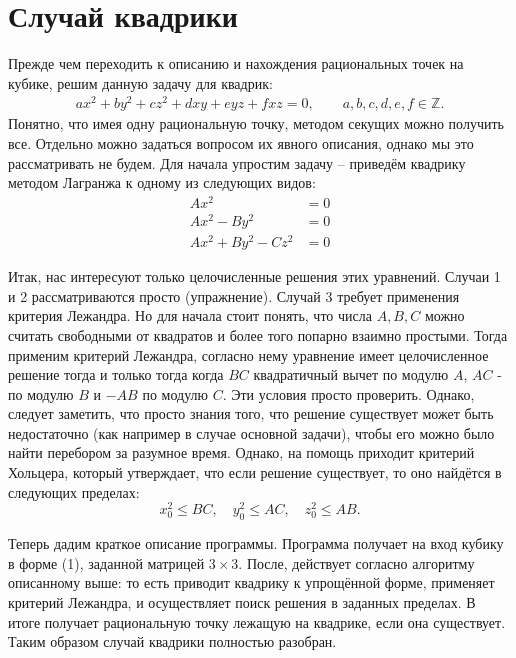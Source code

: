\section*{Случай квадрики}



Прежде чем переходить к описанию и нахождения рациональных точек на кубике,
решим данную задачу для квадрик:
\begin{align}
    a x^2 + b y^2 + c z^2 + d x y + e y z + f x z = 0,  \qquad a, b, c, d, e, f \in
    \mathbb{Z} 
.\end{align}
Понятно, что имея одну рациональную точку, методом секущих можно получить
все. Отдельно можно задаться вопросом их явного описания, однако мы это
рассматривать не будем. Для начала упростим задачу -- приведём квадрику
методом Лагранжа к одному из следующих видов:
\begin{align*}
    A x^2 &= 0 \\
    A x^2 - B y^2 &= 0 \\
    A x^2 + B y^2 - C z^2 &= 0 
\end{align*}

Итак, нас интересуют только целочисленные решения этих уравнений. Случаи 1 и 2
рассматриваются просто (упражнение). Случай 3 требует применения
критерия Лежандра. Но для начала стоит понять, что числа $ A, B, C$ можно
считать свободными от квадратов и более того попарно взаимно простыми. Тогда
применим критерий Лежандра, согласно нему уравнение имеет целочисленное
решение тогда и только тогда когда \(BC\) квадратичный вычет по модулю \(A\),
\(AC\) - по модулю \(B\) и \(-AB\)  по модулю \(C\). Эти условия просто
проверить. Однако, следует заметить, что просто знания того, что решение
существует может быть недостаточно (как например в случае основной задачи),
чтобы его можно было найти перебором за разумное время. Однако, на помощь
приходит критерий Хольцера, который утверждает, что если решение существует,
то оно найдётся в следующих пределах:
\[
x_0^2 \leqslant BC, \quad y_0^2 \leqslant AC, \quad z_0^2 \leqslant AB
.\] 

Теперь дадим краткое описание программы.  Программа получает на вход кубику в
форме (1), заданной матрицей \(3 \times 3\). После, действует согласно алгоритму
описанному выше: то есть приводит квадрику к упрощённой форме, применяет
критерий Лежандра, и осуществляет поиск решения в заданных пределах. В итоге
получает рациональную точку лежащую на квадрике, если она существует. Таким
образом случай квадрики полностью разобран.

\bigskip

